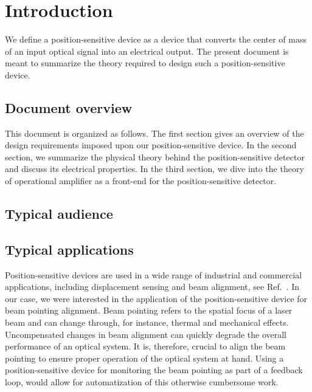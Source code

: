 \section{Introduction}

We define a position-sensitive device as a device that converts the center of mass of an input optical signal into an electrical output.
The present document is meant to summarize the theory required to design such a position-sensitive device.

\subsection{Document overview}

This document is organized as follows.
The first section gives an overview of the design requirements imposed upon our position-sensitive device.
In the second section, we summarize the physical theory behind the position-sensitive detector and discuss its electrical properties.
In the third section, we dive into the theory of operational amplifier as a front-end for the position-sensitive detector.

\subsection{Typical audience}

\subsection{Typical applications}

Position-sensitive devices are used in a wide range of industrial and commercial applications, including displacement sensing and beam alignment, see Ref.~\cite[p.~22]{Maekynen00}.
In our case, we were interested in the application of the position-sensitive device for beam pointing alignment.
Beam pointing refers to the spatial focus of a laser beam and can change through, for instance, thermal and mechanical effects.
Uncompensated changes in beam alignment can quickly degrade the overall performance of an optical system.
It is, therefore, crucial to align the beam pointing to ensure proper operation of the optical system at hand.
Using a position-sensitive device for monitoring the beam pointing as part of a feedback loop, would allow for automatization of this otherwise cumbersome work.